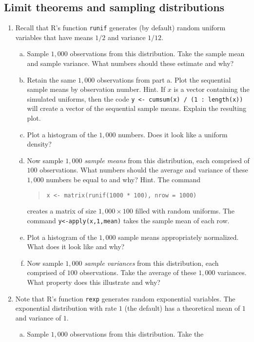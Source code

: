 \documentclass[12pt]{article}
\begin{document}
\begin{enumerate}[1.]
\section{Limit theorems and sampling distributions}
\begin{enumerate}[1.]
\item Recall that R's function \texttt{runif} generates (by default)
  random uniform variables that have means $1/2$ and variance $1/12$.
  \begin{enumerate}[a.]
  \item Sample $1,000$ observations from this distribution. Take the
    sample mean and sample variance. What numbers should these
    estimate and why?
  \item Retain the same $1,000$ observations from part a. Plot the
    sequential sample means by observation number. Hint. If $x$ is a
    vector containing the simulated uniforms, then the code \texttt{y
      <- cumsum(x) / (1 : length(x))} will create a vector of the
    sequential sample means. Explain the resulting plot.
  \item Plot a histogram of the $1,000$ numbers. Does it look like a
    uniform density?
  \item Now sample $1,000$ {\em sample means} from this distribution,
    each comprised of $100$ observations. What numbers should the
    average and variance of these $1,000$ numbers be equal to and why?
    Hint. The command 
    \begin{quote}
      \texttt{x <- matrix(runif(1000 * 100), nrow = 1000)}      
    \end{quote}
    creates a matrix of size $1,000\times 100$ filled with random
    uniforms. The command \texttt{y<-apply(x,1,mean)} takes the sample
    mean of each row.
  \item Plot a histogram of the $1,000$ sample means appropriately
    normalized. What does it look like and why?
  \item Now sample $1,000$ {\em sample variances} from this distribution,
    each comprised of $100$ observations. Take the average of these
    $1,000$ variances. What property does this illustrate and why?
  \end{enumerate}
\item Note that R's function \texttt{rexp} generates random
  exponential variables. The exponential distribution with rate $1$
  (the default) has a theoretical mean of $1$ and variance of $1$.
  \begin{enumerate}[a.]
  \item Sample $1,000$ observations from this distribution. Take the

\end{enumerate}
\end{enumerate}
\end{enumerate}
\end{document}
